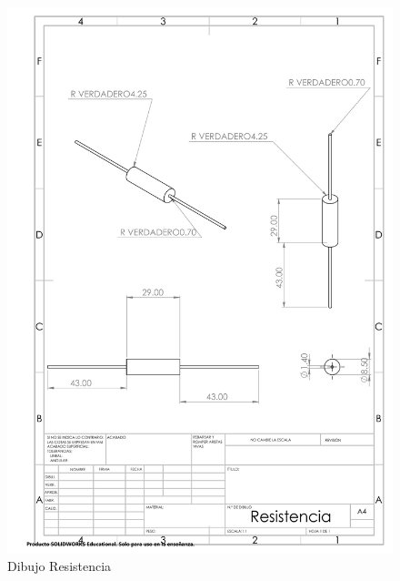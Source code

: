 \begin{figure}[H]
    \centering
    \includegraphics[scale=0.4]{10/Img/cotasResistencia.pdf}
    \caption{Dibujo Resistencia}
    \label{fig:cotasResistencia.png}
\end{figure}


